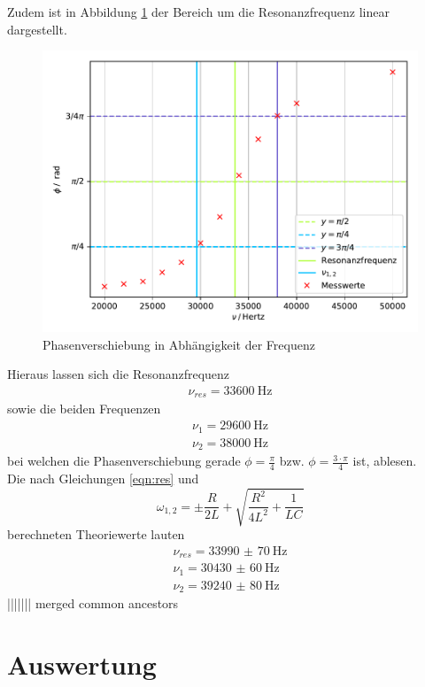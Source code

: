 Zudem ist in Abbildung \ref{fig:plot4} der Bereich um die Resonanzfrequenz linear
dargestellt.

\begin{figure}[H]
  \centering
  \includegraphics{plot5.pdf}
  \caption{Phasenverschiebung in Abhängigkeit der Frequenz}
  \label{fig:plot4}
\end{figure}

\noindent Hieraus lassen sich die Resonanzfrequenz
\begin{align*}
  \nu_{res}= \SI{33600}{\hertz}
\end{align*}
sowie die beiden Frequenzen
\begin{align*}
  \nu_1 = \SI{29600}{\hertz} \\
  \nu_2 = \SI{38000}{\hertz}
\end{align*}
bei welchen die Phasenverschiebung gerade $\phi = \frac{\pi}{4}$ bzw. $\phi= \frac{3 \cdot \pi}{4}$
ist, ablesen. \\
\noindent Die nach Gleichungen \ref{eqn:res} und
\begin{equation}
  \omega_{1,2} = \pm \frac{R}{2L} + \sqrt{\frac{R^2}{4L^2} + \frac{1}{LC}}
\end{equation}
berechneten Theoriewerte lauten
\begin{align*}
  \nu_{res}= \SI{33990(70)}{\hertz} \\
  \nu_1 = \SI{30430(60)}{\hertz} \\
  \nu_2 = \SI{39240(80)}{\hertz}
\end{align*}
||||||| merged common ancestors
\section{Auswertung}
